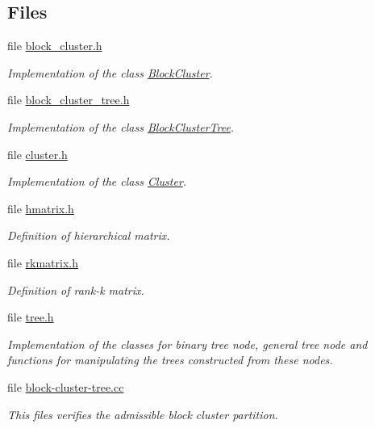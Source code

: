 \subsection*{Files}
\begin{DoxyCompactItemize}
\item 
file \hyperlink{block__cluster_8h}{block\+\_\+cluster.\+h}
\begin{DoxyCompactList}\small\item\em Implementation of the class \hyperlink{classBlockCluster}{Block\+Cluster}. \end{DoxyCompactList}\item 
file \hyperlink{block__cluster__tree_8h}{block\+\_\+cluster\+\_\+tree.\+h}
\begin{DoxyCompactList}\small\item\em Implementation of the class \hyperlink{classBlockClusterTree}{Block\+Cluster\+Tree}. \end{DoxyCompactList}\item 
file \hyperlink{cluster_8h}{cluster.\+h}
\begin{DoxyCompactList}\small\item\em Implementation of the class \hyperlink{classCluster}{Cluster}. \end{DoxyCompactList}\item 
file \hyperlink{hmatrix_8h}{hmatrix.\+h}
\begin{DoxyCompactList}\small\item\em Definition of hierarchical matrix. \end{DoxyCompactList}\item 
file \hyperlink{rkmatrix_8h}{rkmatrix.\+h}
\begin{DoxyCompactList}\small\item\em Definition of rank-\/k matrix. \end{DoxyCompactList}\item 
file \hyperlink{tree_8h}{tree.\+h}
\begin{DoxyCompactList}\small\item\em Implementation of the classes for binary tree node, general tree node and functions for manipulating the trees constructed from these nodes. \end{DoxyCompactList}\item 
file \hyperlink{block-cluster-tree_8cc}{block-\/cluster-\/tree.\+cc}
\begin{DoxyCompactList}\small\item\em This files verifies the admissible block cluster partition. \end{DoxyCompactList}\item 

\end{DoxyCompactItemize}
